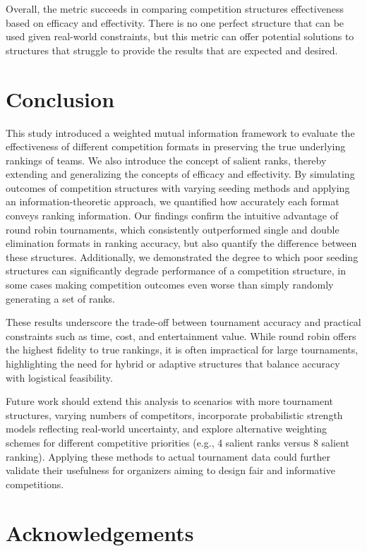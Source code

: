 \documentclass[
  12pt,
]{article}
\begin{document}
Overall, the metric succeeds in comparing competition structures
effectiveness based on efficacy and effectivity. There is no one perfect
structure that can be used given real-world constraints, but this metric
can offer potential solutions to structures that struggle to provide the
results that are expected and desired.

\section{Conclusion}\label{sec:conclusion}

This study introduced a weighted mutual information framework to
evaluate the effectiveness of different competition formats in
preserving the true underlying rankings of teams. We also introduce the
concept of salient ranks, thereby extending and generalizing the
concepts of efficacy and effectivity. By simulating outcomes of
competition structures with varying seeding methods and applying an
information-theoretic approach, we quantified how accurately each format
conveys ranking information. Our findings confirm the intuitive
advantage of round robin tournaments, which consistently outperformed
single and double elimination formats in ranking accuracy, but also
quantify the difference between these structures. Additionally, we
demonstrated the degree to which poor seeding structures can
significantly degrade performance of a competition structure, in some
cases making competition outcomes even worse than simply randomly
generating a set of ranks.

These results underscore the trade-off between tournament accuracy and
practical constraints such as time, cost, and entertainment value. While
round robin offers the highest fidelity to true rankings, it is often
impractical for large tournaments, highlighting the need for hybrid or
adaptive structures that balance accuracy with logistical feasibility.

Future work should extend this analysis to scenarios with more
tournament structures, varying numbers of competitors, incorporate
probabilistic strength models reflecting real-world uncertainty, and
explore alternative weighting schemes for different competitive
priorities (e.g., 4 salient ranks versus 8 salient ranking). Applying
these methods to actual tournament data could further validate their
usefulness for organizers aiming to design fair and informative
competitions.

\section*{Acknowledgements}\label{acknowledgements}
\end{document}

